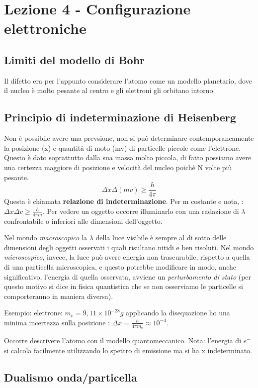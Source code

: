 \chapter{Lezione 4 - Configurazione elettroniche}

\section{Limiti del modello di Bohr}
Il difetto era per l'appunto considerare l'atomo come un modello planetario, dove il nucleo è molto pesante al centro e gli elettroni gli orbitano intorno. 

\section{Principio di indeterminazione di Heisenberg}
Non è possibile avere una prevsione, non si può determinare contemporaneamente la posizione (x) e quantità di moto (mv) di particelle piccole come l'elettrone. Questo è dato soprattutto dalla sua massa molto piccola, di fatto possiamo avere una certezza maggiore di posizione e velocità del nucleo poichè N volte più pesante. \[\Delta x \Delta (mv)\ge \frac{h}{4\pi}\] Questa è chiamata \textbf{relazione di indeterminazione}. Per m costante e nota, : $\Delta x \Delta v \ge \frac{h}{4\pi m}$.
Per vedere un oggetto occorre illuminarlo con una radazione di $\lambda$ confrontabile o inferiori alle dimensioni dell'oggetto.

Nel mondo \emph{macroscopico} la $\lambda$ della luce visibile è sempre al di sotto delle dimensioni degli oggetti osservati i quali risultano nitidi e ben risoluti. 
Nel mondo \emph{microscopico}, invece, la luce può avere energia non trascurabile, rispetto a quella di una particella microscopica, e questo potrebbe modificare in modo, anche significativo, l'energia di quella osservata, avviene un \emph{perturbamento di stato} (per questo motivo si dice in fisica quantistica che se non osserviamo le particelle si comporteranno in maniera diversa). 

Esempio: elettrone: $m_e=9,11\times10^{-28}g$ applicando la disequazione ho una minima incertezza sulla posizione : $\Delta x=\frac{h}{4\pi m_e}\approx 10^{-4}$.

Occorre descrivere l'atomo con il modello quantomeccanico.
Nota: l'energia di $e^{-}$ si calcola facilmente utilizzando lo spettro di emissione ma si ha x indeterminato. 

\section{Dualismo onda/particella}
